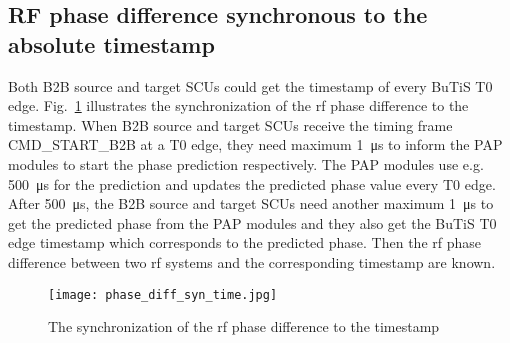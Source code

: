 \subsection{RF phase difference synchronous to the absolute timestamp}
Both B2B source and target SCUs could get the timestamp of every BuTiS T0 edge. Fig.~\ref{phase_diff_syn_time} illustrates the synchronization of the rf phase difference to the timestamp. When B2B source and target SCUs receive the timing frame CMD\_START\_B2B at a T0 edge, they need maximum \SI{1}{\us} to inform the PAP modules to start the phase prediction respectively. The PAP modules use e.g. \SI{500}{\us} for the prediction and updates the predicted phase value every T0 edge. After \SI{500}{\us}, the B2B source and target SCUs need another maximum \SI{1}{\us} to get the predicted phase from the PAP modules and they also get the BuTiS T0 edge timestamp which corresponds to the predicted phase. Then the rf phase difference between two rf systems and the corresponding timestamp are known. 
 \begin{figure}[!htb]
   \centering   
   \texttt{[image: phase\_diff\_syn\_time.jpg]}
   \caption{The synchronization of the rf phase difference to the timestamp}
   \label{phase_diff_syn_time}
\end{figure}
